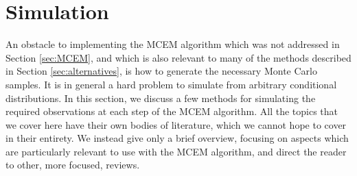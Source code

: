 \documentclass[11pt, oneside]{article}   	%
\newcommand{\bQ}{\mathbb{Q}}
\begin{document}
\begin{comment}
A major advantage of the mean-field approximation is that an iterative algorithm exists for finding the density, $q$, which maximizes the ELBO. This algorithm performs coordinate ascent, and the coordinate updates are closely related to computation of the full conditional distributions in Gibbs sampling \citep{need}. Write $q^{(k)} = \prod q_j^{(k)}$ for the current value of $q$, and $\bQ^{(k)}_{-j}$ for expectation with respect to all the missing variables except $j$, under $q^{(k)}$. The update formula is
%
\begin{align}
    q_j^{(k+1)} &\propto \exp \left[ \bQ^{(k)}_{-j} \ell_c(y, x_j, X_{-j}) \right] \label{eq:var_inf_update}
\end{align}
%
where $X_{-j}$ is all the missing variables other than $X_j$. See Section 2.4 of \citet{Ble17} for a derivation of (\ref{eq:var_inf_update}). The overall algorithm consists of repeatedly cycling through updating each coordinate's distribution until some convergence criterion is met.

Note that, so far, our discussion of how to compute the mean-field approximate density for $X$ has not addressed $\theta$. To apply mean-field variational inference to EM-type problems, we substitute the mean-field density into the ELBO and maximize over $\theta$. This new value of $\theta$ is fed back into ($\ref{eq:var_inf_update}$), giving us a different complete data likelihood function and, hence, a new optimal density.
\end{comment}




\section{Simulation}
\label{sec:simulation}

An obstacle to implementing the MCEM algorithm which was not addressed in Section \ref{sec:MCEM}, and which is also relevant to many of the methods described in Section \ref{sec:alternatives}, is how to generate the necessary Monte Carlo samples. It is in general a hard problem to simulate from arbitrary conditional distributions. In this section, we discuss a few methods for simulating the required observations at each step of the MCEM algorithm. All the topics that we cover here have their own bodies of literature, which we cannot hope to cover in their entirety. We instead give only a brief overview, focusing on aspects which are particularly relevant to use with the MCEM algorithm, and direct the reader to other, more focused, reviews.
\end{document}
